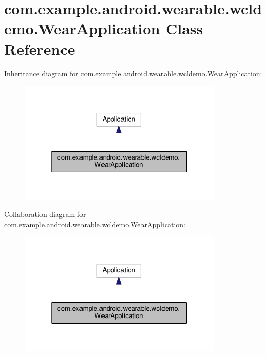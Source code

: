 \hypertarget{classcom_1_1example_1_1android_1_1wearable_1_1wcldemo_1_1WearApplication}{}\section{com.\+example.\+android.\+wearable.\+wcldemo.\+Wear\+Application Class Reference}
\label{classcom_1_1example_1_1android_1_1wearable_1_1wcldemo_1_1WearApplication}


Inheritance diagram for com.\+example.\+android.\+wearable.\+wcldemo.\+Wear\+Application\+:
\nopagebreak
\begin{figure}[H]
\begin{center}
\leavevmode
\includegraphics[width=277pt]{d2/d98/classcom_1_1example_1_1android_1_1wearable_1_1wcldemo_1_1WearApplication__inherit__graph}
\end{center}
\end{figure}


Collaboration diagram for com.\+example.\+android.\+wearable.\+wcldemo.\+Wear\+Application\+:
\nopagebreak
\begin{figure}[H]
\begin{center}
\leavevmode
\includegraphics[width=277pt]{d9/d05/classcom_1_1example_1_1android_1_1wearable_1_1wcldemo_1_1WearApplication__coll__graph}
\end{center}
\end{figure}
